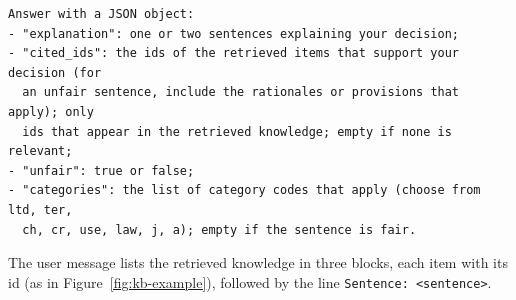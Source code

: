 {\begin{verbatim}
Answer with a JSON object:
- "explanation": one or two sentences explaining your decision;
- "cited_ids": the ids of the retrieved items that support your decision (for
  an unfair sentence, include the rationales or provisions that apply); only
  ids that appear in the retrieved knowledge; empty if none is relevant;
- "unfair": true or false;
- "categories": the list of category codes that apply (choose from ltd, ter,
  ch, cr, use, law, j, a); empty if the sentence is fair.
\end{verbatim}
}

The user message lists the retrieved knowledge in three blocks, each item with its id (as in Figure~\ref{fig:kb-example}), followed by the line \texttt{Sentence: <sentence>}.

